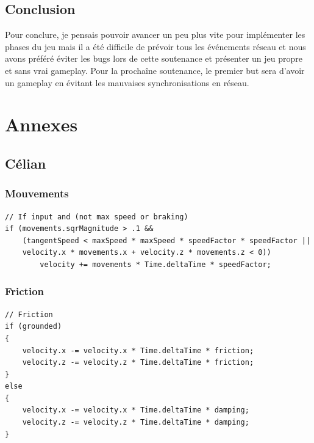 \documentclass{article}
\begin{document}
\subsection{Conclusion}

Pour conclure, je pensais pouvoir avancer un peu plus vite pour implémenter les phases du jeu mais il a été difficile de prévoir tous les événements réseau et nous avons préféré éviter les bugs lors de cette soutenance et présenter un jeu propre et sans vrai gameplay.
Pour la prochaîne soutenance, le premier but sera d'avoir un gameplay en évitant les mauvaises synchronisations en réseau.



 
\newpage
\section{Annexes}


\subsection{Célian}
\subsubsection{Mouvements}
\label{Mouvements}
\begin{lstlisting}
// If input and (not max speed or braking)
if (movements.sqrMagnitude > .1 &&
    (tangentSpeed < maxSpeed * maxSpeed * speedFactor * speedFactor ||
    velocity.x * movements.x + velocity.z * movements.z < 0))
        velocity += movements * Time.deltaTime * speedFactor;
\end{lstlisting}

\subsubsection{Friction}
\label{Friction}
\begin{lstlisting}
// Friction
if (grounded)
{
    velocity.x -= velocity.x * Time.deltaTime * friction;
    velocity.z -= velocity.z * Time.deltaTime * friction;
}
else
{
    velocity.x -= velocity.x * Time.deltaTime * damping;
    velocity.z -= velocity.z * Time.deltaTime * damping;
}
\end{lstlisting}
\end{document}
